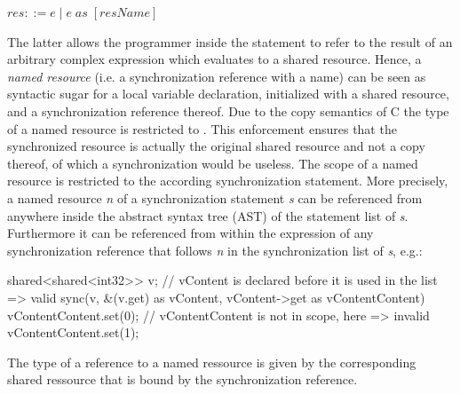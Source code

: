 $ res ::= e\;|\;e\;\mathit{as}\;[\mathit{resName}] $

The latter allows the programmer inside the  statement to refer to the result of an arbitrary complex expression which evaluates to a shared resource. Hence, a \textit{named resource} (i.e. a synchronization reference with a name) can be seen as syntactic sugar for a local variable declaration, initialized with a shared resource, and a synchronization reference thereof. Due to the copy semantics of C the type of a named resource  is restricted to . This enforcement ensures that the synchronized resource is actually the original shared resource and not a copy thereof, of which a synchronization would be useless. The scope of a named resource is restricted to the according synchronization statement. More precisely, a named resource \textit{n} of a synchronization statement \textit{s} can be referenced from anywhere inside the abstract syntax tree (AST) of the statement list of \textit{s}. Furthermore it can be referenced from within the expression of any synchronization reference that follows \textit{n} in the synchronization list of \textit{s}, e.g.:
\begin{ccode}
shared<shared<int32>> v;
// vContent is declared before it is used in the list => valid
sync(v, &(v.get) as vContent, vContent->get as vContentContent) {
  vContentContent.set(0);
}
// vContentContent is not in scope, here => invalid
vContentContent.set(1);
\end{ccode}

The type of a reference to a named ressource is given by the corresponding shared ressource that is bound by the  synchronization reference.

